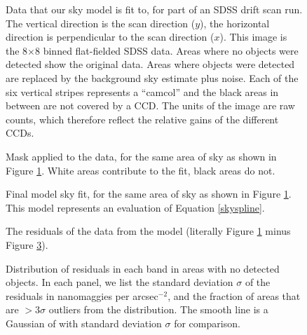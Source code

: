 \clearpage

\setcounter{thefigs}{0}

\clearpage
{}
\begin{figure}
\figurenum{\fignum}
\caption{\label{fig:rawrun} Data that our sky model is fit to, for
part of an SDSS drift scan run.  The vertical direction is the scan
direction ($y$), the horizontal direction is perpendicular to the scan
direction ($x$). This image is the 8$\times$8 binned flat-fielded SDSS
data. Areas where no objects were detected show the original data.
Areas where objects were detected are replaced by the background sky
estimate plus noise. Each of the six vertical stripes represents a
``camcol'' and the black areas in between are not covered by a
CCD. The units of the image are raw counts, which therefore reflect
the relative gains of the different CCDs. }
\end{figure}

\clearpage
{}
\begin{figure}
\figurenum{\fignum}
\caption{\label{fig:mask} Mask applied to the data, for the same area
of sky as shown in Figure \ref{fig:rawrun}. White areas contribute to
the fit, black areas do not.}
\end{figure}

\clearpage
{}
\begin{figure}
\figurenum{\fignum}
\caption{\label{fig:model} Final model sky fit, for the same area of
sky as shown in Figure \ref{fig:rawrun}. This model represents an
evaluation of Equation \ref{skyspline}.}
\end{figure}

\clearpage
{}
\begin{figure}
\figurenum{\fignum}
\caption{\label{fig:resid} The residuals of the data from the model
(literally Figure \ref{fig:rawrun} minus Figure \ref{fig:model}).}
\end{figure}

\clearpage
{}
\begin{figure}
\figurenum{\fignum}
\caption{\label{fig:skyqa} Distribution of residuals in each band in
areas with no detected objects. In each panel, we list the standard
deviation $\sigma$ of the residuals in nanomaggies per arcsec$^{-2}$, and the
fraction of areas that are $>3\sigma$ outliers from the
distribution. The smooth line is a Gaussian of with standard deviation
$\sigma$ for comparison. }
\end{figure}

